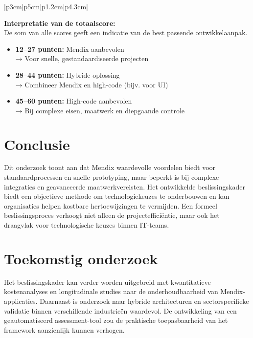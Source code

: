 \documentclass[a0,portrait]{hogent-poster}
\begin{document}
\begin{multicols}{2}
\begin{center}
\begin{minipage}{0.6\linewidth}
\begin{tabular}{|p{3cm}|p{5cm}|p{1.2cm}|p{4.3cm}|}
                    \hline
                \end{tabular}
            \end{minipage}
            \hfill
            \begin{minipage}{0.35\linewidth}
                \scriptsize
                \textbf{Interpretatie van de totaalscore:} \\
                \vspace{0.5em}
                De som van alle scores geeft een indicatie van de best passende ontwikkelaanpak. \\
                
                \vspace{0.5em}
                \begin{itemize}
                    \item \textbf{12–27 punten:} Mendix aanbevolen \\
                    → Voor snelle, gestandaardiseerde projecten
                    \item \textbf{28–44 punten:} Hybride oplossing \\
                    → Combineer Mendix en high-code (bijv. voor UI)
                    \item \textbf{45–60 punten:} High-code aanbevolen \\
                    → Bij complexe eisen, maatwerk en diepgaande controle
                \end{itemize}
            \end{minipage}
        \end{center}
        
        \section{Conclusie}
        Dit onderzoek toont aan dat Mendix waardevolle voordelen biedt voor standaardprocessen en snelle prototyping, maar beperkt is bij complexe integraties en geavanceerde maatwerkvereisten. Het ontwikkelde beslissingskader biedt een objectieve methode om technologiekeuzes te onderbouwen en kan organisaties helpen kostbare hertoewijzingen te vermijden. Een formeel beslissingsproces verhoogt niet alleen de projectefficiëntie, maar ook het draagvlak voor technologische keuzes binnen IT-teams.
        
        \section{Toekomstig onderzoek}
        Het beslissingskader kan verder worden uitgebreid met kwantitatieve kostenanalyses en longitudinale studies naar de onderhoudbaarheid van Mendix-applicaties. Daarnaast is onderzoek naar hybride architecturen en sectorspecifieke validatie binnen verschillende industrieën waardevol. De ontwikkeling van een geautomatiseerd assessment-tool zou de praktische toepasbaarheid van het framework aanzienlijk kunnen verhogen.
        
    \end{multicols}
    
\end{document}
